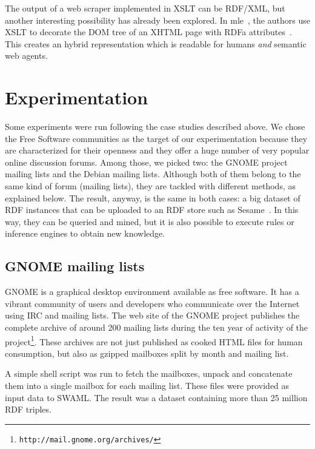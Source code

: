 \documentclass{../templates/www2008-submission}
\begin{document}
The output of a web scraper implemented in XSLT can be RDF/XML, but
another interesting possibility has already been explored. In
mle~\cite{Hausenblas2007}, the authors use XSLT to decorate the
DOM tree of an XHTML page with RDFa attributes~\cite{Birbeck2006}.
This creates an hybrid representation which is readable for
humans \emph{and} semantic web agents.


\section{\label{sec:experimentation}Experimentation}

Some experiments were run following the case studies described above.
We chose the Free Software communities as the target of our
experimentation because they are characterized for their openness and
they offer a huge number of very popular online discussion forums.
Among those, we picked two: the GNOME project mailing lists and
the Debian mailing lists. Although both of them belong to the same
kind of forum (mailing lists), they are tackled with different methods,
as explained below. The result, anyway, is the same in both cases:
a big dataset of RDF instances that can be uploaded to an RDF
store such as Sesame~\cite{Broekstra2002}. In this way, they can be
queried and mined, but it is also possible to execute rules or
inference engines to obtain new knowledge.

\subsection{\label{sec:gnome}GNOME mailing lists}

GNOME is a graphical desktop environment available as free
software. It has a vibrant community of users and developers
who communicate over the Internet using IRC and mailing lists.
The web site of the GNOME project publishes the complete archive
of around 200 mailing lists during the ten year of activity of
the project\footnote{\texttt{http://mail.gnome.org/archives/}}.
These archives are not just published as cooked HTML files for
human consumption, but also as gzipped mailboxes split by
month and mailing list.

A simple shell script was run to fetch the mailboxes, unpack and concatenate them
into a single mailbox for each mailing list. These files
were provided as input data to SWAML. The
result was a dataset containing more than 25 million RDF triples.
\end{document}
